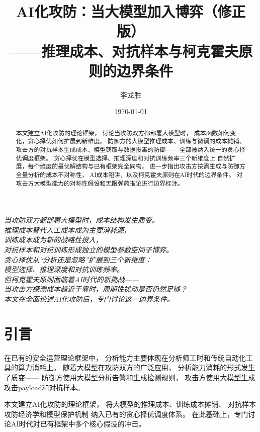 \documentclass[11pt,a4paper]{article}
\title{AI化攻防：当大模型加入博弈（修正版）\\
——推理成本、对抗样本与柯克霍夫原则的边界条件}
\author{李龙胜}
\date{\today}
\begin{document}
\maketitle

\begin{center}
\textit{
当攻防双方都部署大模型时，成本结构发生质变。\\
推理成本替代人工成本成为主要消耗源，\\
训练成本成为新的战略性投入，\\
对抗样本和对抗训练形成独立的模型参数空间子博弈。\\
贪心择优从“分析还是忽略”扩展到三个新维度：\\
模型选择、推理深度和对抗训练频率。\\
但柯克霍夫原则面临着AI时代的新挑战——\\
当攻击方探测成本趋近于零时，周期性扰动是否仍然足够？\\
本文在全面论述AI化攻防后，专门讨论这一边界条件。
}
\end{center}

\vspace{5mm}

\begin{abstract}
本文建立AI化攻防的理论框架，
讨论当攻防双方都部署大模型时，
成本函数如何变化，贪心择优如何扩展到新维度。
防御方的大模型推理成本、训练与微调的成本摊销、
攻击方的对抗样本生成成本、模型窃取与数据投毒的防御——
全部被纳入统一的贪心择优调度框架。
贪心择优在模型选择、推理深度和对抗训练频率三个新维度上
自然扩展，每个维度的最优解结构与已有框架完全同构。
进一步指出攻击方按需生成与防御方全量分析的成本不对称性，
AI成本陷阱，以及柯克霍夫原则在AI时代的边界条件。
对攻击方大模型能力的对称性假设和无限弹药推论进行边界标注。
\end{abstract}

\tableofcontents

\section{引言}

在已有的安全运营理论框架中，
分析能力主要体现在分析师工时和传统自动化工具的算力消耗上。
随着大模型在攻防双方的广泛应用，
分析能力消耗的形式发生了质变——
防御方使用大模型分析告警和生成检测规则，
攻击方使用大模型生成攻击payload和对抗样本。

本文建立AI化攻防的理论框架，
将大模型的推理成本、训练成本摊销、
对抗样本攻防经济学和模型保护机制
纳入已有的贪心择优调度体系。
在此基础上，专门讨论AI时代对已有框架中多个核心假设的冲击。
\end{document}
